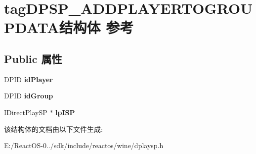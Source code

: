 \hypertarget{structtag_d_p_s_p___a_d_d_p_l_a_y_e_r_t_o_g_r_o_u_p_d_a_t_a}{}\section{tag\+D\+P\+S\+P\+\_\+\+A\+D\+D\+P\+L\+A\+Y\+E\+R\+T\+O\+G\+R\+O\+U\+P\+D\+A\+T\+A结构体 参考}
\label{structtag_d_p_s_p___a_d_d_p_l_a_y_e_r_t_o_g_r_o_u_p_d_a_t_a}
\subsection*{Public 属性}
\begin{DoxyCompactItemize}
\item 
\mbox{\label{structtag_d_p_s_p___a_d_d_p_l_a_y_e_r_t_o_g_r_o_u_p_d_a_t_a_a49e63692ac99e95e0595085875a8d864}} 
D\+P\+ID {\bfseries id\+Player}
\item 
\mbox{\label{structtag_d_p_s_p___a_d_d_p_l_a_y_e_r_t_o_g_r_o_u_p_d_a_t_a_a4aec48b316304d67c73a0560522a8159}} 
D\+P\+ID {\bfseries id\+Group}
\item 
\mbox{\label{structtag_d_p_s_p___a_d_d_p_l_a_y_e_r_t_o_g_r_o_u_p_d_a_t_a_a4ef67a80d7b70119639155beec800ab8}} 
I\+Direct\+Play\+SP $\ast$ {\bfseries lp\+I\+SP}
\end{DoxyCompactItemize}


该结构体的文档由以下文件生成\+:\begin{DoxyCompactItemize}
\item 
E\+:/\+React\+O\+S-\/0../sdk/include/reactos/wine/dplaysp.\+h\end{DoxyCompactItemize}
